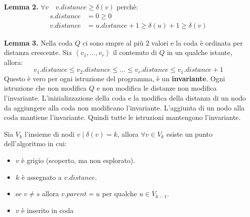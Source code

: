 \documentclass[a4paper]{article}
\begin{document}
\noindent
\textbf{Lemma 2.} \( \forall v \quad v.distance \ge \delta(v) \) perchè:
\[
  \begin{aligned}
    s.distance &= 0 \ge 0\\
    v.distance &= u.distance + 1 \ge \delta(u) + 1 \ge \delta(v)
  \end{aligned}
\] 

\noindent
\textbf{Lemma 3.} Nella coda \( Q \) ci sono smpre al più 2 valori e la coda è ordinata
per distanza crescente.
Sia \( \left<v_1, \ldots, v_r \right> \) il contenuto di \( Q \) in un qualche istante,
allora:
\[
  v_1.distance \le v_2.distance \le \ldots \le v_r.distance \le v_1.distance + 1
\] 
Questo è vero per ogni istruzione del programma, è un \textbf{invariante}.
Ogni istruzione che non modifica \( Q \) e non modifica le distanze non modifica l'invariante.
L'inizializzazione della coda e la modifica della distanza di un nodo da aggiungere alla
coda non modificano l'invariante. L'aggiunta di un nodo alla coda mantiene l'invariante.
Quindi tutte le istruzioni mantengono l'invariante.

\begin{theorem}
  Sia \( V_k \) l'insieme di nodi \( v \;\big|\; \delta(v) = k \), allora
  \( \forall v \in V_k \) esiste un punto dell'algoritmo in cui:
  \begin{itemize}
    \item \( v \) è grigio (scoperto, ma non esplorato).
    \item \( k \) è assegnato a \( v.distance \).
    \item se \( v \neq s \) allora \( v.parent = u \) per qualche \( u \in V_{k-1} \).
    \item \( v \) è inserito in coda
  \end{itemize}
\end{theorem}
\end{document}
